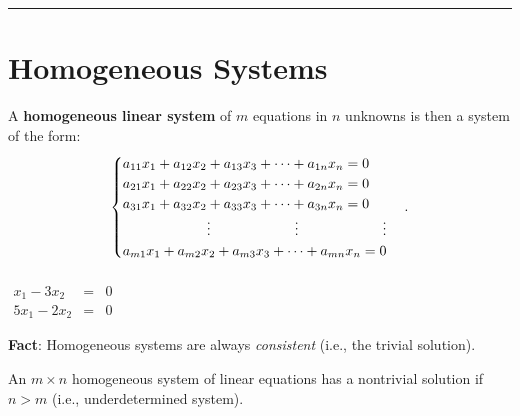 \rule[0.01in]{\textwidth}{0.0025in}









\section{Homogeneous Systems}

A {\color{blue}\textbf{homogeneous linear system}} of $m$ equations in $n$ unknowns is then a system of the form: 
\[ 
\begin{cases} 
a_{11} x_1 + a_{12} x_2 + a_{13} x_3 + \dots + a_{1n} x_n = 0\\
 a_{21} x_1 + a_{22} x_2 + a_{23} x_3 + \dots + a_{2n} x_n = 0\\
a_{31} x_1 + a_{32} x_2 + a_{33} x_3 + \dots + a_{3n} x_n = 0\\

\hfill \vdots \hfill \vdots \hfill \vdots \\

a_{m1} x_1 + a_{m2} x_2 + a_{m3} x_3 + \dots + a_{mn} x_n = 0
\end{cases} .
 \]


 

\begin{example}
$ \begin{array}{rcl}& & \\ x_1 - 3x_2 & = & 0 \\ 5x_1 - 2 x_2 & = & 0 \end{array}$
\end{example}









\textbf{Fact}: Homogeneous systems are always \textit{consistent} (i.e., the trivial solution). 

\begin{theorem}
An $m \times n$ homogeneous system of linear equations has a nontrivial solution if $n > m$ (i.e., underdetermined system).  
\end{theorem}


